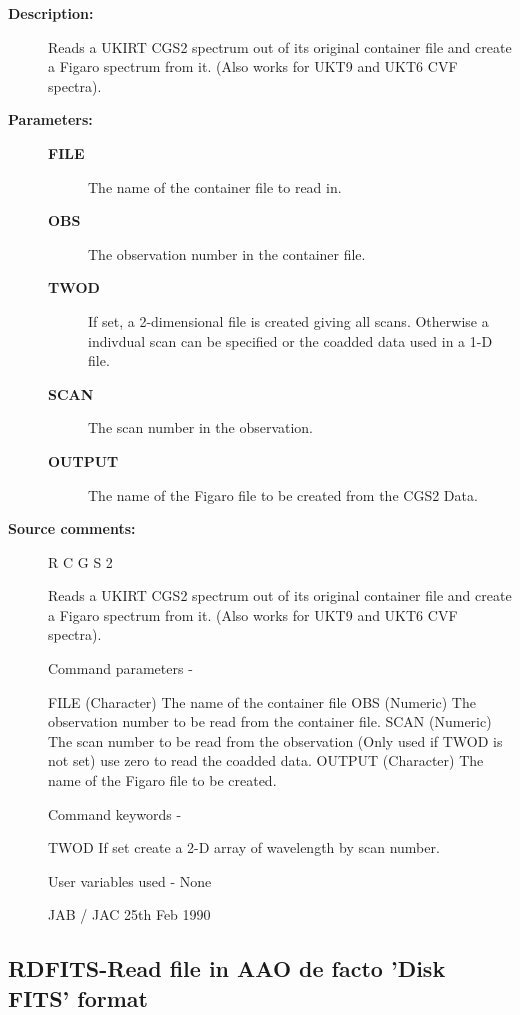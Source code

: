\begin{description}
\begin{description}
\item [\textbf{Description:}]
 Reads a UKIRT CGS2 spectrum out of its original container
 file and create a Figaro spectrum from it. (Also works for
 UKT9 and UKT6 CVF spectra).

\item [\textbf{Parameters:}]
\begin{description}
\item [\textbf{FILE}]
 The name of the container file to read in.
\item [\textbf{OBS}]
 The observation number in the container file.
\item [\textbf{TWOD}]
 If set, a 2-dimensional file is created giving all scans.
 Otherwise a indivdual scan can be specified or the coadded
 data used in a 1-D file.
\item [\textbf{SCAN}]
 The scan number in the observation.
\item [\textbf{OUTPUT}]
 The name of the Figaro file to be created from the
 CGS2 Data.
\end{description}

\item [\textbf{Source comments:}]
\begin{terminalv}
 R C G S 2

 Reads a UKIRT CGS2 spectrum out of its original container file
 and create a Figaro spectrum from it. (Also works for UKT9
 and UKT6 CVF spectra).

 Command parameters -

 FILE    (Character) The name of the container file
 OBS     (Numeric) The observation number to be read from
         the container file.
 SCAN    (Numeric) The scan number to be read from the observation
         (Only used if TWOD is not set) use zero to read the coadded data.
 OUTPUT  (Character) The name of the Figaro file to be created.

 Command keywords -

 TWOD    If set create a 2-D array of wavelength by scan
         number.

 User variables used - None

                                  JAB / JAC  25th Feb 1990
\end{terminalv}
\end{description}
\subsection{RDFITS-\label{RDFITS}Read file in AAO de facto 'Disk FITS' format}
\begin{description}


\end{description}
\end{description}
